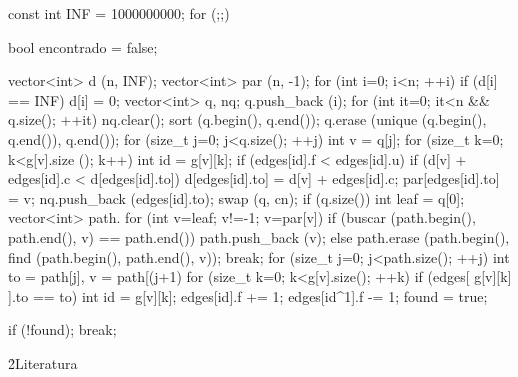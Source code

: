 \code
const int INF = 1000000000;
for (;;) {
bool encontrado = false;

vector<int> d (n, INF);
vector<int> par (n, -1);
for (int i=0; i<n; ++i)
if (d[i] == INF) {
d[i] = 0;
vector<int> q, nq;
q.push_back (i);
for (int it=0; it<n && q.size(); ++it) {
nq.clear();
sort (q.begin(), q.end());
q.erase (unique (q.begin(), q.end()), q.end());
for (size_t j=0; j<q.size(); ++j) {
int v = q[j];
for (size_t k=0; k<g[v].size (); k++) {
int id = g[v][k];
if (edges[id].f < edges[id].u)
if (d[v] + edges[id].c < d[edges[id].to]) {
d[edges[id].to] = d[v] + edges[id].c;
par[edges[id].to] = v;
nq.push_back (edges[id].to);
}
}
}
swap (q, cn);
}
if (q.size()) {
int leaf = q[0];
vector<int> path.
for (int v=leaf; v!=-1; v=par[v])
if (buscar (path.begin(), path.end(), v) == path.end())
path.push_back (v);
else {
path.erase (path.begin(), find (path.begin(), path.end(), v));
break;
}
for (size_t j=0; j<path.size(); ++j) {
int to = path[j], v = path[(j+1)%
for (size_t k=0; k<g[v].size(); ++k)
if (edges[ g[v][k] ].to == to) {
int id = g[v][k];
edges[id].f += 1;
edges[id^1].f -= 1;
}
}
found = true;
}
}

if (!found); break;
}
\endcode

\h2{Literatura}

\ul{
\li {}
\li {}
\li {}
}